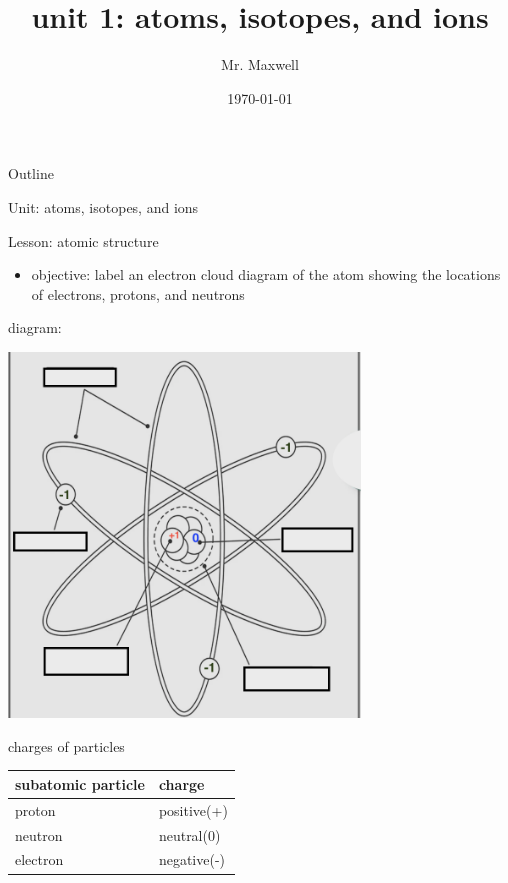 \documentclass[presentation]{beamer}
\author{Mr. Maxwell}
\date{\today}
\title{unit 1: atoms, isotopes, and ions}
\begin{document}
\maketitle
\begin{frame}{Outline}
\tableofcontents
\end{frame}



\begin{frame}[label={sec:org3d84294}]{Unit: atoms, isotopes, and ions}
\begin{block}{Lesson: atomic structure}
\begin{itemize}
\item \alert{objective:} label an electron cloud diagram of the atom showing the locations of electrons, protons, and neutrons
\end{itemize}
\begin{block}{diagram:}
\begin{center}
\includegraphics[width=0.7\textwidth]{./atomNotes.png}
\end{center}
\end{block}

\begin{block}{charges of particles}
\begin{center}
\begin{tabular}{ll}
subatomic particle & charge\\[0pt]
\hline
proton & positive(+)\\[0pt]
neutron & neutral(0)\\[0pt]
electron & negative(-)\\[0pt]
\end{tabular}
\end{center}
\end{block}
\end{block}
\end{frame}
\end{document}

